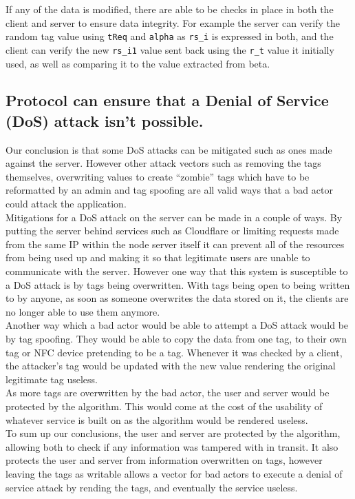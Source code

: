 If any of the data is modified, there are able to be checks in place in both the client and server to ensure data integrity. For example the server can verify the random tag value using \verb|tReq| and \verb|alpha| as \verb|rs_i| is expressed in both, and the client can verify the new \verb|rs_i1| value sent back using the \verb|r_t| value it initially used, as well as comparing it to the value extracted from beta.
 
\subsection{Protocol can ensure that a Denial of Service (DoS) attack isn’t possible.}
 
Our conclusion is that some DoS attacks can be mitigated such as ones made against the server. However other attack vectors such as removing the tags themselves, overwriting values to create “zombie” tags which have to be reformatted by an admin and tag spoofing are all valid ways that a bad actor could attack the application.\\

Mitigations for a DoS attack on the server can be made in a couple of ways. By putting the server behind services such as Cloudflare or limiting requests made from the same IP within the node server itself it can prevent all of the resources from being used up and making it so that legitimate users are unable to communicate with the server. However one way that this system is susceptible to a DoS attack is by tags being overwritten. With tags being open to being written to by anyone, as soon as someone overwrites the data stored on it, the clients are no longer able to use them anymore.\\

Another way which a bad actor would be able to attempt a DoS attack would be by tag spoofing. They would be able to copy the data from one tag, to their own tag or NFC device pretending to be a tag. Whenever it was checked by a client, the attacker’s tag would be updated with the new value rendering the original legitimate tag useless.\\

As more tags are overwritten by the bad actor, the user and server would be protected by the algorithm. This would come at the cost of the usability of whatever service is built on as the algorithm would be rendered useless.\\

To sum up our conclusions, the user and server are protected by the algorithm, allowing both to check if any information was tampered with in transit. It also protects the user and server from information overwritten on tags, however leaving the tags as writable allows a vector for bad actors to execute a denial of service attack by rending the tags, and eventually the service useless.
